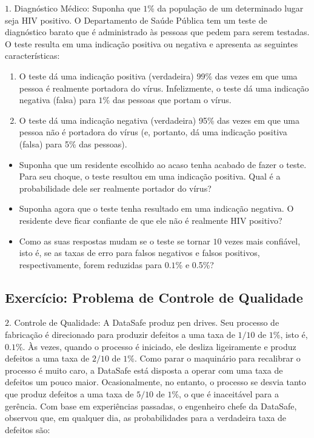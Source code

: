 \documentclass[]{article}
\begin{document}
\(1\). Diagnóstico Médico: Suponha que \(1\)\% da população de um
determinado lugar seja HIV positivo. O Departamento de Saúde Pública tem
um teste de diagnóstico barato que é administrado às pessoas que pedem
para serem testadas. O teste resulta em uma indicação positiva ou
negativa e apresenta as seguintes características:

\begin{enumerate}
\def\labelenumi{(\alph{enumi})}
\item
  O teste dá uma indicação positiva (verdadeira) 99\% das vezes em que
  uma pessoa é realmente portadora do vírus. Infelizmente, o teste dá
  uma indicação negativa (falsa) para \(1\)\% das pessoas que portam o
  vírus.
\item
  O teste dá uma indicação negativa (verdadeira) 95\% das vezes em que
  uma pessoa não é portadora do vírus (e, portanto, dá uma indicação
  positiva (falsa) para 5\% das pessoas).
\end{enumerate}

\begin{itemize}
\item
  Suponha que um residente escolhido ao acaso tenha acabado de fazer o
  teste. Para seu choque, o teste resultou em uma indicação positiva.
  Qual é a probabilidade dele ser realmente portador do vírus?
\item
  Suponha agora que o teste tenha resultado em uma indicação negativa. O
  residente deve ficar confiante de que ele não é realmente HIV
  positivo?
\item
  Como as suas respostas mudam se o teste se tornar \(10\) vezes mais
  confiável, isto é, se as taxas de erro para falsos negativos e falsos
  positivos, respectivamente, forem reduzidas para \(0.1\)\% e 0.5\%?
\end{itemize}

\subsection{Exercício: Problema de Controle de
Qualidade}\label{exercicio-problema-de-controle-de-qualidade}

\(2\). Controle de Qualidade: A DataSafe produz pen drives. Seu processo
de fabricação é direcionado para produzir defeitos a uma taxa de
\(1/10\) de \(1\)\%, isto é, \(0.1\)\%. Às vezes, quando o processo é
iniciado, ele desliza ligeiramente e produz defeitos a uma taxa de
\(2/10\) de \(1\)\%. Como parar o maquinário para recalibrar o processo
é muito caro, a DataSafe está disposta a operar com uma taxa de defeitos
um pouco maior. Ocasionalmente, no entanto, o processo se desvia tanto
que produz defeitos a uma taxa de \(5/10\) de \(1\)\%, o que é
inaceitável para a gerência. Com base em experiências passadas, o
engenheiro chefe da DataSafe, observou que, em qualquer dia, as
probabilidades para a verdadeira taxa de defeitos são:
\end{document}
